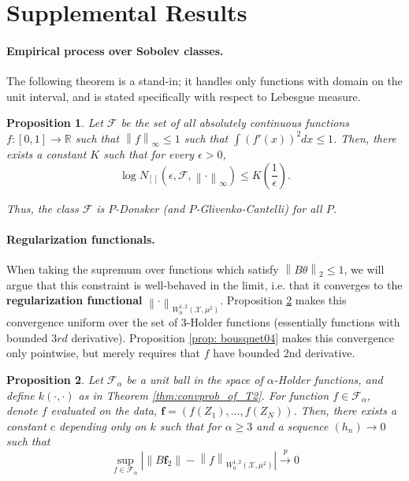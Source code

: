 \documentclass{article}
\newcommand{\Reals}{\mathbb{R}}
\newcommand{\convprob}{\overset{p}{\to}}
\newcommand{\norm}[1]{\left\lVert#1\right\rVert}
\newcommand{\abs}[1]{\left \lvert #1 \right \rvert}
\newcommand{\F}{\mathcal{F}}
\newcommand{\X}{\mathcal{X}}
\theoremstyle{alden}
\newtheorem{proposition}{Proposition}
\theoremstyle{definition}
\theoremstyle{remark}
\begin{document}
\section{Supplemental Results}

\paragraph{Empirical process over Sobolev classes.}

The following theorem is a stand-in; it handles only functions with domain on the unit interval, and is stated specifically with respect to Lebesgue measure.
\begin{proposition}
	\label{prop: sobolev_donsker}
	Let $\F$ be the set of all absolutely continuous functions $f: [0,1] \to \Reals$ such that $\norm{f}_{\infty} \leq 1$ such that $\int (f'(x))^2 dx \leq 1$. Then, there exists a constant $K$ such that for every $\epsilon > 0$,
	\begin{equation*}
	\log N_{[]}(\epsilon, \mathcal{F}, \norm{\cdot}_{\infty}) \leq K\left(\frac{1}{\epsilon}\right).
	\end{equation*} 
	
	Thus, the class $\mathcal{F}$ is $P$-Donsker (and $P$-Glivenko-Cantelli) for all $P$.
\end{proposition}

\paragraph{Regularization functionals.}

When taking the supremum over functions which satisfy $\norm{B \theta}_2 \leq 1$, we will argue that this constraint is well-behaved in the limit, i.e. that it converges to the \textbf{regularization functional} $\norm{\cdot}_{W_0^{1,2}(\X, \mu^2)}$. Proposition \ref{prop: convprob_regularization_functional} makes this convergence uniform over the set of $3$-Holder functions (essentially functions with bounded $3rd$ derivative). Proposition \ref{prop: bousquet04} makes this convergence only pointwise, but merely requires that $f$ have bounded 2nd derivative. 

\begin{proposition}
	\label{prop: convprob_regularization_functional}
	Let $\mathcal{F}_{\alpha}$ be a unit ball in the space of $\alpha$-Holder functions, and define $k(\cdot,\cdot)$ as in Theorem \ref{thm:convprob_of_T2}. For function $f \in \F_{\alpha}$, denote $f$ evaluated on the data, $\mathbf{f} = (f(Z_1), \ldots, f(Z_N))$. Then, there exists a constant $c$ depending only on $k$ such that for $\alpha \geq 3$ and a sequence $(h_n) \to 0$ such that
	\begin{equation*}
	\sup_{f \in \mathcal{F}_{\alpha}} \abs{ \norm{B \mathbf{f}_2} - \norm{f}_{W_0^{1,2}(\X, \mu^2)} } \convprob 0
	\end{equation*}
\end{proposition}
\end{document}
